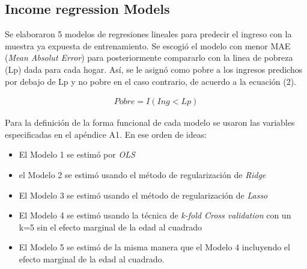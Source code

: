 \documentclass[11pt]{article}
\begin{document}
\subsection{Income regression Models}

 Se elaboraron 5 modelos de regresiones lineales para predecir el ingreso con la muestra ya expuesta de entrenamiento. Se escogió el modelo con menor MAE (\emph{Mean Absolut Error}) para posteriormente compararlo con la linea de pobreza (Lp) dada para cada hogar. Así, se le asignó como pobre a los ingresos predichos por debajo de Lp y no pobre en el caso contrario, de acuerdo a la ecuación (2).
 
 \begin{equation}
 \begin{split}
 Pobre = I(Ing < Lp)
 \end{split}
 \end{equation}
 
 
 \justify
 Para la definición de la forma funcional de cada modelo se usaron las variables especificadas en el apéndice A1. En ese orden de ideas:
  \begin{itemize}
      \item El Modelo 1 se estimó por \emph{OLS}
      \item  el Modelo 2 se estimó usando el método de regularización de \emph{Ridge}
       \item El Modelo 3 se estimó usando el método de regularización de \emph{Lasso}
       \item El Modelo 4 se estimó usando la técnica de \emph{k-fold Cross validation} con un k=5 sin el efecto marginal de la edad al cuadrado
       \item El Modelo 5 se estimó de la misma manera que el Modelo 4 incluyendo el efecto marginal de la edad al cuadrado.
  \end{itemize}
 
\end{document}
